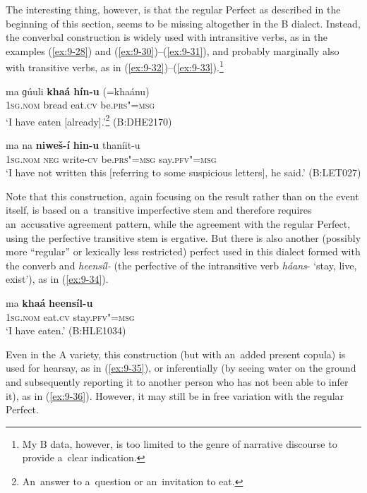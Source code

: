 The interesting thing, however, is that the regular Perfect as described in the beginning of this section, seems to be missing altogether in the B dialect. Instead, the converbal construction is widely used with intransitive verbs, as in the examples (\ref{ex:9-28}) and (\ref{ex:9-30})--(\ref{ex:9-31}), and probably marginally also with transitive verbs, as in (\ref{ex:9-32})--(\ref{ex:9-33}).\footnote{My B data, however, is too limited to the genre of narrative discourse to provide a~clear indication.}

\begin{exe}
\ex
\label{ex:9-32}
\gll ma ɡúuli \textbf{khaá} \textbf{hín-u} (=khaánu)\\
\textsc{1sg.nom} bread eat.\textsc{cv} be.\textsc{prs"=msg} \\
\glt `I have eaten [already].'\footnote{An~answer to a~question or an~invitation to eat.} (B:DHE2170)

\ex
\label{ex:9-33}
\gll ma na \textbf{niweš-í} \textbf{hin-u} thaníit-u\\
\textsc{1sg.nom} \textsc{neg} write-\textsc{cv} be.\textsc{prs"=msg} say.\textsc{pfv"=msg} \\
\glt `I have not written this [referring to some suspicious letters], he said.' (B:LET027)
\end{exe}

Note that this construction, again focusing on the result rather than on the event itself, is based on a~transitive imperfective stem and therefore requires an~accusative agreement pattern, while the agreement with the regular Perfect, using the perfective transitive stem is ergative. But there is also another (possibly more ``regular'' or lexically less restricted) perfect used in this dialect formed with the converb and \textit{heensíl-} (the perfective of the intransitive verb \textit{háans}- `stay, live, exist'), as in (\ref{ex:9-34}).

\begin{exe}
\ex
\label{ex:9-34}
\gll ma \textbf{khaá} \textbf{heensíl-u}  \\
\textsc{1sg.nom} eat.\textsc{cv} stay.\textsc{pfv"=msg} \\
\glt `I have eaten.' (B:HLE1034)
\end{exe}

Even in the A variety, this construction (but with an~added present copula) is used for hearsay, as in (\ref{ex:9-35}), or inferentially (by seeing water on the ground and subsequently reporting it to another person who has not been able to infer it), as in (\ref{ex:9-36}). However, it may still be in free variation with the regular Perfect.

